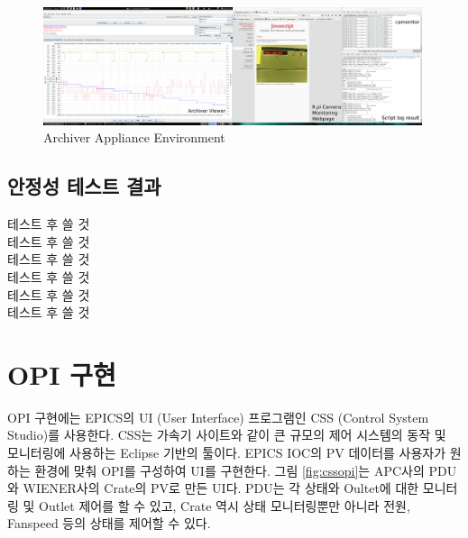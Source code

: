 \documentclass[11pt
  , a4paper
  , article
  , oneside
]{memoir}
\begin{document}
\begin{figure}[h!]
  \centering
  \includegraphics[width=0.99\textwidth]{./images/allscreen_2_comment.eps}
  \caption{Archiver Appliance Environment}
  \label{fig:allscreen}   
\end{figure}

\clearpage

\subsection{안정성 테스트 결과}

테스트 후 쓸 것\\
테스트 후 쓸 것\\
테스트 후 쓸 것\\
테스트 후 쓸 것\\
테스트 후 쓸 것\\
테스트 후 쓸 것\\


\section{OPI 구현}
OPI 구현에는 EPICS의 UI (User Interface) 프로그램인 CSS (Control System Studio)를 사용한다. CSS는 가속기 사이트와 같이 큰 규모의 제어 시스템의 동작 및 모니터링에 사용하는 Eclipse 기반의 툴이다\citep{css}. EPICS IOC의 PV 데이터를 사용자가 원하는 환경에 맞춰 OPI를 구성하여 UI를 구현한다. 그림 \ref{fig:cssopi}는 APC사의 PDU와 WIENER사의 Crate의 PV로 만든 UI다. PDU는 각 상태와 Oultet에 대한 모니터링 및 Outlet 제어를 할 수 있고, Crate 역시 상태 모니터링뿐만 아니라 전원, Fanspeed 등의 상태를 제어할 수 있다. 
\end{document}
